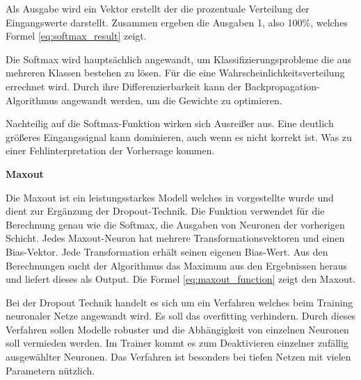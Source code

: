 Als Ausgabe wird ein Vektor erstellt der die prozentuale Verteilung der Eingangswerte darstellt. Zusammen ergeben die Ausgaben 1, also 100\%, welches Formel \ref{eq:softmax_result} zeigt.


Die Softmax wird hauptsächlich angewandt, um Klassifizierungsprobleme die aus mehreren Klassen bestehen zu lösen. Für die eine Wahrscheinlichkeitsverteilung errechnet wird. Durch ihre Differenzierbarkeit kann der Backpropagation-Algorithmus angewandt werden, um die Gewichte zu optimieren.\vspace{0.2cm}

Nachteilig auf die Softmax-Funktion wirken sich Ausreißer aus. Eine deutlich größeres Eingangssignal kann dominieren, auch wenn es nicht korrekt ist. Was zu einer Fehlinterpretation der Vorhersage kommen.\vspace{0.2cm}

%
\textbf{Maxout}\vspace{0.2cm}

Die Maxout ist ein leistungsstarkes Modell welches in \cite{goodfellow_maxout_2013} vorgestellte wurde und dient zur Ergänzung der Dropout-Technik. Die Funktion verwendet für die Berechnung genau wie die Softmax, die Ausgaben von Neuronen der vorherigen Schicht. Jedes Maxout-Neuron hat mehrere Transformationsvektoren und einen Bias-Vektor. Jede Transformation erhält seinen eigenen Bias-Wert. Aus den Berechnungen sucht der Algorithmus das Maximum aus den Ergebnissen heraus und liefert dieses als Output. Die Formel \ref{eq:maxout_function} zeigt den Maxout.


Bei der Dropout Technik handelt es sich um ein Verfahren welches beim Training neuronaler Netze angewandt wird. Es soll das \gls{overfitting} verhindern. Durch dieses Verfahren sollen Modelle robuster und die Abhängigkeit von einzelnen Neuronen soll vermieden werden. Im Trainer kommt es zum Deaktivieren einzelner zufällig ausgewählter Neuronen. Das Verfahren ist besonders bei tiefen Netzen mit vielen Parametern nützlich.


